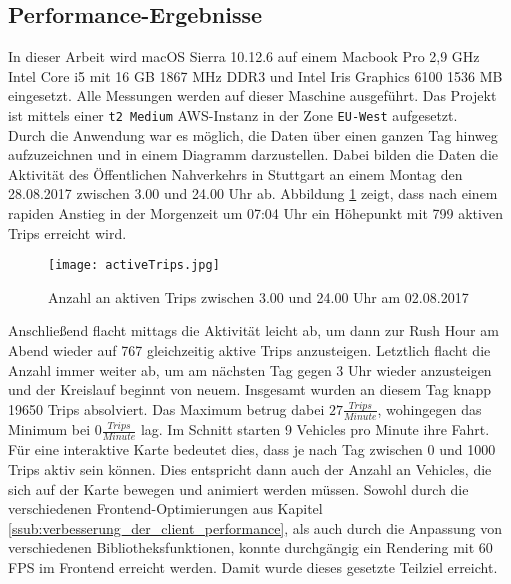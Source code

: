 \subsection{Performance-Ergebnisse}
\label{sub:performance_ergebnisse}
  In dieser Arbeit wird macOS Sierra 10.12.6 auf einem Macbook Pro 2,9 GHz Intel Core i5 mit 16 GB 1867 MHz DDR3 und Intel Iris Graphics 6100 1536 MB eingesetzt. Alle Messungen werden auf dieser Maschine ausgeführt. Das Projekt ist mittels einer \texttt{t2 Medium} AWS-Instanz in der Zone \texttt{EU-West} aufgesetzt.\\

  Durch die Anwendung war es möglich, die Daten über einen ganzen Tag hinweg aufzuzeichnen und in einem Diagramm darzustellen. Dabei bilden die Daten die Aktivität des Öffentlichen Nahverkehrs in Stuttgart an einem Montag den 28.08.2017 zwischen 3.00 und 24.00 Uhr ab. Abbildung \ref{fig:activeTrips} zeigt, dass nach einem rapiden Anstieg in der Morgenzeit um 07:04 Uhr ein Höhepunkt mit 799 aktiven Trips erreicht wird.

  \begin{figure}[ht]
    \begin{center}
      \texttt{[image: activeTrips.jpg]}
      \caption{Anzahl an aktiven Trips zwischen 3.00 und 24.00 Uhr am 02.08.2017}
      \label{fig:activeTrips}
    \end{center}
  \end{figure}

  Anschließend flacht mittags die Aktivität leicht ab, um dann zur Rush Hour am Abend wieder auf 767 gleichzeitig aktive Trips anzusteigen. Letztlich flacht die Anzahl immer weiter ab, um am nächsten Tag gegen 3 Uhr wieder anzusteigen und der Kreislauf beginnt von neuem. Insgesamt wurden an diesem Tag knapp 19650 Trips absolviert. Das Maximum betrug dabei $27 \frac{Trips}{Minute}$, wohingegen das Minimum bei $0 \frac{Trips}{Minute}$ lag. Im Schnitt starten 9 Vehicles pro Minute ihre Fahrt. Für eine interaktive Karte bedeutet dies, dass je nach Tag zwischen 0 und 1000 Trips aktiv sein können. Dies entspricht dann auch der Anzahl an Vehicles, die sich auf der Karte bewegen und animiert werden müssen. Sowohl durch die verschiedenen Frontend-Optimierungen aus Kapitel \ref{ssub:verbesserung_der_client_performance}, als auch durch die Anpassung von verschiedenen Bibliotheksfunktionen, konnte durchgängig ein Rendering mit 60 FPS im Frontend erreicht werden. Damit wurde dieses gesetzte Teilziel erreicht.\\

